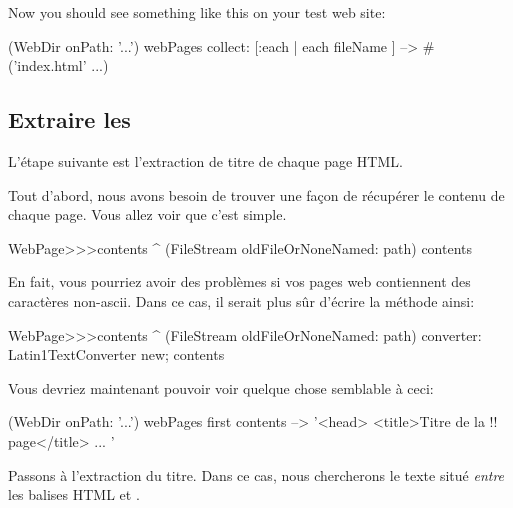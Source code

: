 \documentclass[a4paper,10pt,twoside]{book}
\begin{document}
Now you should see something like this on your test web site:

\begin{code}{}
(WebDir onPath: '...') webPages collect: [:each | each fileName ]
  --> #('index.html' ...)
\end{code}

\subsection{Extraire les \regexmatches}

L'étape suivante est l'extraction de titre de chaque page HTML.

Tout d'abord, nous avons besoin de trouver une façon de récupérer le
contenu de chaque page. Vous allez voir que c'est simple.


\begin{code}{}
WebPage>>>contents
	^ (FileStream oldFileOrNoneNamed: path) contents
\end{code}

En fait, vous pourriez avoir des problèmes si vos pages web
contiennent des caractères non-ascii. Dans ce cas, il serait plus sûr
d'écrire la méthode ainsi:

\begin{code}{}
WebPage>>>contents
	^ (FileStream oldFileOrNoneNamed: path)
		converter: Latin1TextConverter new;
		contents
\end{code}

Vous devriez maintenant pouvoir voir quelque chose semblable à ceci:

\begin{code}{}
(WebDir onPath: '...') webPages first contents --> '<head>
<title>Titre de la !! page</title>
...
'
\end{code}

Passons à l'extraction du titre. Dans ce cas, nous chercherons le
texte situé \emph{entre} les balises HTML  et . 
\end{document}
